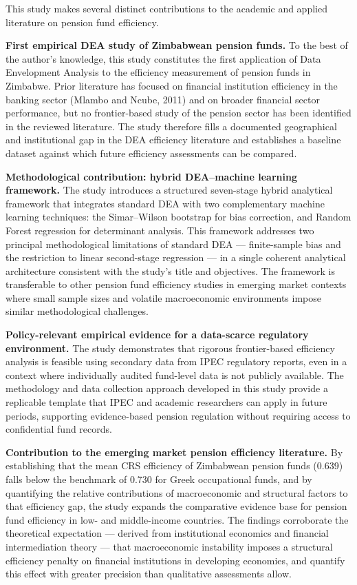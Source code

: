 \documentclass[12pt,a4paper]{article}
\begin{document}
This study makes several distinct contributions to the academic and applied literature on pension fund efficiency.

\textbf{First empirical DEA study of Zimbabwean pension funds.} To the best of the author's knowledge, this study constitutes the first application of Data Envelopment Analysis to the efficiency measurement of pension funds in Zimbabwe. Prior literature has focused on financial institution efficiency in the banking sector (Mlambo and Ncube, 2011) and on broader financial sector performance, but no frontier-based study of the pension sector has been identified in the reviewed literature. The study therefore fills a documented geographical and institutional gap in the DEA efficiency literature and establishes a baseline dataset against which future efficiency assessments can be compared.

\textbf{Methodological contribution: hybrid DEA--machine learning framework.} The study introduces a structured seven-stage hybrid analytical framework that integrates standard DEA with two complementary machine learning techniques: the Simar--Wilson bootstrap for bias correction, and Random Forest regression for determinant analysis. This framework addresses two principal methodological limitations of standard DEA --- finite-sample bias and the restriction to linear second-stage regression --- in a single coherent analytical architecture consistent with the study's title and objectives. The framework is transferable to other pension fund efficiency studies in emerging market contexts where small sample sizes and volatile macroeconomic environments impose similar methodological challenges.

\textbf{Policy-relevant empirical evidence for a data-scarce regulatory environment.} The study demonstrates that rigorous frontier-based efficiency analysis is feasible using secondary data from IPEC regulatory reports, even in a context where individually audited fund-level data is not publicly available. The methodology and data collection approach developed in this study provide a replicable template that IPEC and academic researchers can apply in future periods, supporting evidence-based pension regulation without requiring access to confidential fund records.

\textbf{Contribution to the emerging market pension efficiency literature.} By establishing that the mean CRS efficiency of Zimbabwean pension funds (0.639) falls below the benchmark of 0.730 for Greek occupational funds, and by quantifying the relative contributions of macroeconomic and structural factors to that efficiency gap, the study expands the comparative evidence base for pension fund efficiency in low- and middle-income countries. The findings corroborate the theoretical expectation --- derived from institutional economics and financial intermediation theory --- that macroeconomic instability imposes a structural efficiency penalty on financial institutions in developing economies, and quantify this effect with greater precision than qualitative assessments allow.
\end{document}
